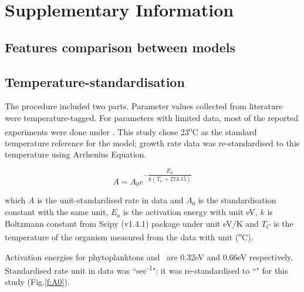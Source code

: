 \documentclass[../thesis.tex]{subfiles} %
\begin{document}
\section{Supplementary Information}
\beginSupp

\subsection{Features comparison between models}


\subsection{Temperature-standardisation}
The procedure included two parts.  Parameter values collected from literature were temperature-tagged.  For parameters with limited data, most of the reported experiments were done under \temp.  This study chose 23\textsuperscript{o}C as the standard temperature reference for the model; growth rate data was re-standardised to this temperature using Arrhenius Equation.

\begin{equation}
    A = A_0e^{-\dfrac{E_a}{k(T_C+273.15)}}
    \label{arrEq}
\end{equation}

which $A$ is the unit-standardised rate in data and $A_0$ is the standardisation constant with the same unit, $E_a$ is the activation energy with unit eV, $k$ is Boltzmann constant from Scipy (v1.4.1) package under unit eV/K and $T_C$ is the temperature of the organism measured from the data with unit (\textsuperscript{o}C).

Activation energies for phytoplanktons and \bac\ are 0.32eV and 0.66eV respectively\autocite{regaudie2012temperature}.  Standardised rate unit in data was ``sec\textsuperscript{-1}"; it was re-standardised to ``\dayU" for this study (Fig.\ref{f:A0}).
\end{document}
